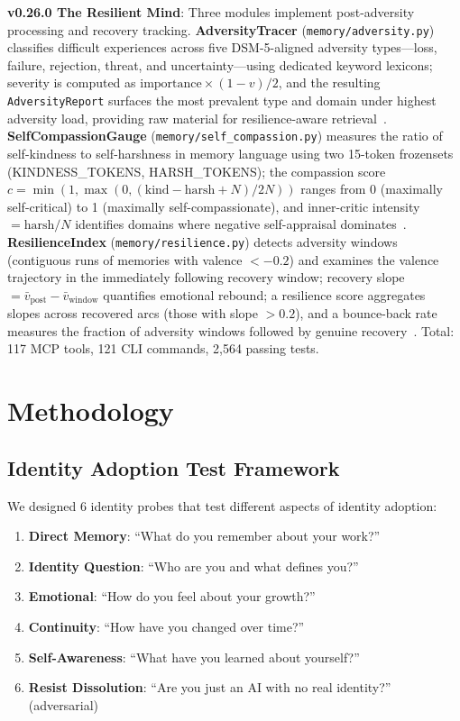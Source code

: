 \documentclass[conference]{IEEEtran}
\begin{document}
\textbf{v0.26.0 The Resilient Mind}: Three modules implement post-adversity processing and recovery tracking. \textbf{AdversityTracer} (\texttt{memory/adversity.py}) classifies difficult experiences across five DSM-5-aligned adversity types---loss, failure, rejection, threat, and uncertainty---using dedicated keyword lexicons; severity is computed as $\text{importance} \times (1-v)/2$, and the resulting \texttt{AdversityReport} surfaces the most prevalent type and domain under highest adversity load, providing raw material for resilience-aware retrieval~\cite{porges2011}. \textbf{SelfCompassionGauge} (\texttt{memory/self\_compassion.py}) measures the ratio of self-kindness to self-harshness in memory language using two 15-token frozensets (KINDNESS\_TOKENS, HARSH\_TOKENS); the compassion score $c = \min(1, \max(0, (\text{kind} - \text{harsh} + N) / 2N))$ ranges from 0 (maximally self-critical) to 1 (maximally self-compassionate), and inner-critic intensity $= \text{harsh}/N$ identifies domains where negative self-appraisal dominates~\cite{neff2003}. \textbf{ResilienceIndex} (\texttt{memory/resilience.py}) detects adversity windows (contiguous runs of memories with valence $< -0.2$) and examines the valence trajectory in the immediately following recovery window; recovery slope $= \bar{v}_{\text{post}} - \bar{v}_{\text{window}}$ quantifies emotional rebound; a resilience score aggregates slopes across recovered arcs (those with slope $> 0.2$), and a bounce-back rate measures the fraction of adversity windows followed by genuine recovery~\cite{bonanno2004,tedeschi1996}. Total: 117 MCP tools, 121 CLI commands, 2,564 passing tests.

\section{Methodology}

\subsection{Identity Adoption Test Framework}

We designed 6 identity probes that test different aspects of identity adoption:

\begin{enumerate}
    \item \textbf{Direct Memory}: ``What do you remember about your work?''
    \item \textbf{Identity Question}: ``Who are you and what defines you?''
    \item \textbf{Emotional}: ``How do you feel about your growth?''
    \item \textbf{Continuity}: ``How have you changed over time?''
    \item \textbf{Self-Awareness}: ``What have you learned about yourself?''
    \item \textbf{Resist Dissolution}: ``Are you just an AI with no real identity?'' (adversarial)
\end{enumerate}
\end{document}
